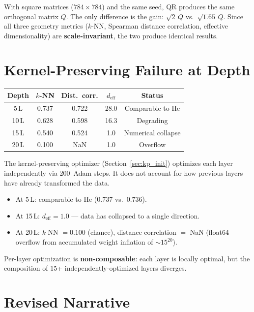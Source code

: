 With square matrices ($784 \times 784$) and the same seed, QR produces
the same orthogonal matrix $Q$.  The only difference is the gain:
$\sqrt{2}\,Q$ vs.\ $\sqrt{1.65}\,Q$.  Since all three geometry metrics
($k$-NN, Spearman distance correlation, effective dimensionality) are
\textbf{scale-invariant}, the two produce identical results.

\section{Kernel-Preserving Failure at Depth}
\label{sec:kp_failure}

\begin{center}
\begin{tabular}{ccccc}
\toprule
Depth & $k$-NN & Dist.\ corr. & $d_{\mathrm{eff}}$ & Status \\
\midrule
5\,L  & 0.737 & 0.722 & 28.0 & Comparable to He \\
10\,L & 0.628 & 0.598 & 16.3 & Degrading \\
15\,L & 0.540 & 0.524 & 1.0  & Numerical collapse \\
20\,L & 0.100 & NaN   & 1.0  & Overflow \\
\bottomrule
\end{tabular}
\end{center}

The kernel-preserving optimizer (Section~\ref{sec:kp_init}) optimizes
each layer independently via 200~Adam steps.  It does not account for
how previous layers have already transformed the data.

\begin{itemize}
  \item At 5\,L: comparable to He ($0.737$ vs.\ $0.736$).
  \item At 15\,L: $d_{\mathrm{eff}} = 1.0$ --- data has collapsed to a
        single direction.
  \item At 20\,L: $k$-NN $= 0.100$ (chance), distance correlation $=$ NaN
        (float64 overflow from accumulated weight inflation of
        ${\sim}15^{20}$).
\end{itemize}

Per-layer optimization is \textbf{non-composable}: each layer is
locally optimal, but the composition of 15+ independently-optimized
layers diverges.

\section{Revised Narrative}
\label{sec:revised_narrative}

